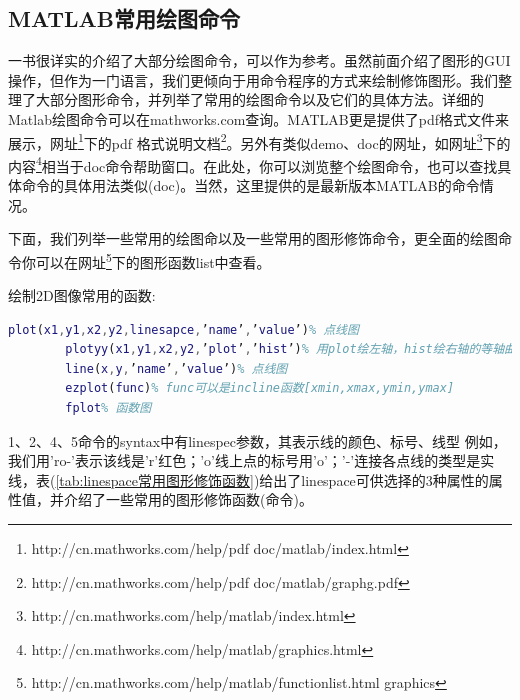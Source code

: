     \subsection{MATLAB常用绘图命令}
        \par
        \cite{zhangdefeng}一书很详实的介绍了大部分绘图命令，可以作为参考。虽然前面介绍了图形的GUI操作，但作为一门语言，我们更倾向于用命令程序的方式来绘制修饰图形。我们整理了大部分图形命令，并列举了常用的绘图命令以及它们的具体方法。详细的Matlab绘图命令可以在mathworks.com查询。MATLAB更是提供了pdf格式文件来展示，网址\footnote{http://cn.mathworks.com/help/pdf doc/matlab/index.html}下的pdf 格式说明文档\footnote{http://cn.mathworks.com/help/pdf doc/matlab/graphg.pdf}。另外有类似demo、doc的网址，如网址\footnote{http://cn.mathworks.com/help/matlab/index.html}下的内容\footnote{http://cn.mathworks.com/help/matlab/graphics.html}相当于doc命令帮助窗口。在此处，你可以浏览整个绘图命令，也可以查找具体命令的具体用法类似(doc)。当然，这里提供的是最新版本MATLAB的命令情况。
        \par
        下面，我们列举一些常用的绘图命以及一些常用的图形修饰命令，更全面的绘图命令你可以在网址\footnote{http://cn.mathworks.com/help/matlab/functionlist.html graphics}下的图形函数list中查看。
        \par
        绘制2D图像常用的函数:
        \begin{lstlisting}[language = Matlab]
        plot(x1,y1,x2,y2,linesapce,’name’,’value’)% 点线图
        plotyy(x1,y1,x2,y2,’plot’,’hist’)% 用plot绘左轴，hist绘右轴的等轴曲线图
        line(x,y,’name’,’value’)% 点线图
        ezplot(func)% func可以是incline函数[xmin,xmax,ymin,ymax]
        fplot% 函数图
        \end{lstlisting}
        \par
        1、2、4、5命令的syntax中有linespec参数，其表示线的颜色、标号、线型
        例如，我们用’ro-’表示该线是’r’红色；’o’线上点的标号用’o’；’-’连接各点线的类型是实线，表(\ref{tab:linespace常用图形修饰函数})给出了linespace可供选择的3种属性的属性值，并介绍了一些常用的图形修饰函数(命令)。
